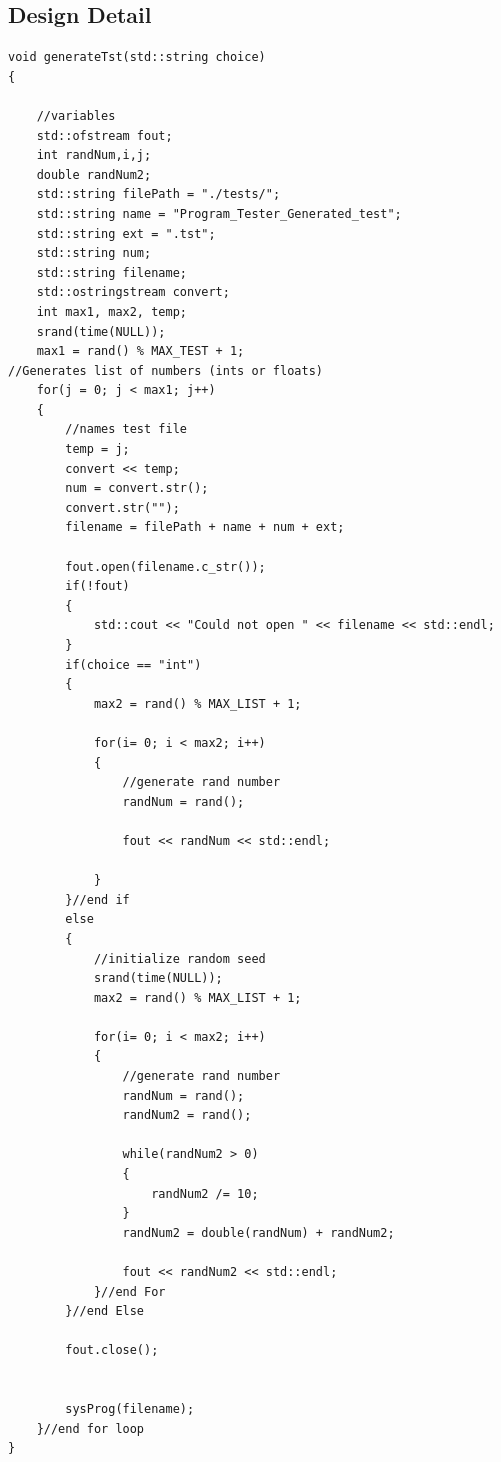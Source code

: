 \subsection{Design Detail}
\begin{lstlisting}
void generateTst(std::string choice)
{

    //variables
    std::ofstream fout;
    int randNum,i,j;
    double randNum2;
    std::string filePath = "./tests/";
    std::string name = "Program_Tester_Generated_test";
    std::string ext = ".tst";
    std::string num;
    std::string filename;
    std::ostringstream convert;
    int max1, max2, temp;
    srand(time(NULL)); 
    max1 = rand() % MAX_TEST + 1;
//Generates list of numbers (ints or floats)
    for(j = 0; j < max1; j++)
    {
        //names test file  
        temp = j;
        convert << temp;
        num = convert.str();
        convert.str("");
        filename = filePath + name + num + ext;

        fout.open(filename.c_str());
        if(!fout)
        {
            std::cout << "Could not open " << filename << std::endl;
        }
        if(choice == "int")
        {
            max2 = rand() % MAX_LIST + 1;

            for(i= 0; i < max2; i++)
            {
                //generate rand number
                randNum = rand();

                fout << randNum << std::endl;

            }
        }//end if
        else
        {
            //initialize random seed
            srand(time(NULL)); 
            max2 = rand() % MAX_LIST + 1;

            for(i= 0; i < max2; i++)
            {
                //generate rand number
                randNum = rand();
                randNum2 = rand();

                while(randNum2 > 0)
                {
                    randNum2 /= 10;
                }
                randNum2 = double(randNum) + randNum2;

                fout << randNum2 << std::endl;
            }//end For
        }//end Else

        fout.close();


        sysProg(filename);
    }//end for loop
}
\end{lstlisting}

